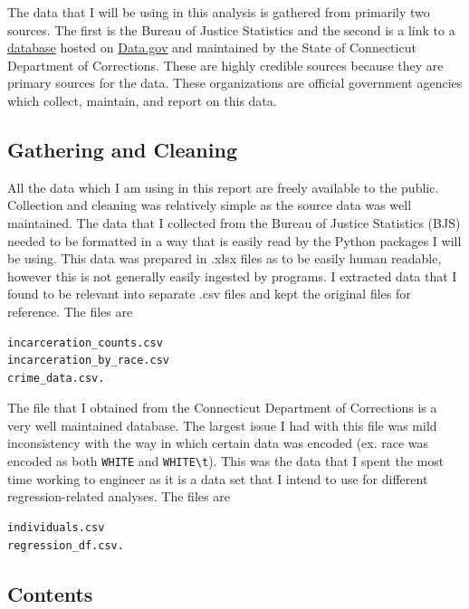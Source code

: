 \documentclass[11pt]{article}
\begin{document}
The data that I will be using in this analysis is gathered from
primarily two sources. The first is the Bureau of Justice Statistics and
the second is a link to a
\href{https://catalog.data.gov/dataset/sentenced-inmates-in-correctional-facilities}{database}
hosted on \href{https://www.data.gov}{Data.gov} and maintained by the
State of Connecticut Department of Corrections. These are highly
credible sources because they are primary sources for the data. These
organizations are official government agencies which collect, maintain,
and report on this data.

\hypertarget{gathering-and-cleaning}{%
\subsection{Gathering and Cleaning}\label{gathering-and-cleaning}}

All the data which I am using in this report are freely available to the
public. Collection and cleaning was relatively simple as the source data
was well maintained. The data that I collected from the Bureau of
Justice Statistics (BJS) needed to be formatted in a way that is easily
read by the Python packages I will be using. This data was prepared in
.xlsx files as to be easily human readable, however this is not
generally easily ingested by programs. I extracted data that I found to
be relevant into separate .csv files and kept the original files for
reference. The files are

\begin{verbatim}
incarceration_counts.csv
incarceration_by_race.csv
crime_data.csv.
\end{verbatim}

The file that I obtained from the Connecticut Department of Corrections
is a very well maintained database. The largest issue I had with this
file was mild inconsistency with the way in which certain data was
encoded (ex. race was encoded as both \texttt{WHITE} and
\texttt{WHITE\textbackslash{}t}). This was the data that I spent the
most time working to engineer as it is a data set that I intend to use
for different regression-related analyses. The files are

\begin{verbatim}
individuals.csv
regression_df.csv.
\end{verbatim}

    \hypertarget{contents}{%
\subsection{Contents}\label{contents}}
\end{document}
